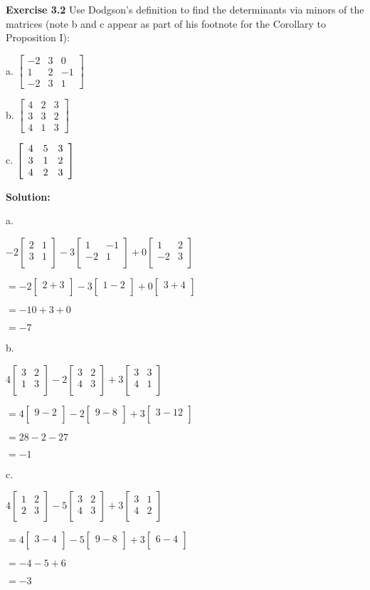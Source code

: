 \documentclass[12pt]{article}
\newcommand{\sol} {\textbf{Solution:}}
\newcommand{\matx}[1] {
\begin{bmatrix}
  #1 \\
\end{bmatrix}
}
\newcommand{\matxx}[2] {
\begin{bmatrix}
  #1 \\
  #2 \\
\end{bmatrix}
}
\begin{document}
\bigskip
\noindent\textbf{Exercise 3.2} Use Dodgson's definition to find the
determinants via minors of the matrices (note b and c appear as part of his
footnote for the Corollary to Proposition I):

a. $%
\begin{bmatrix}
-2 & 3 & 0\\
1 & 2 & -1\\
-2 & 3 & 1
\end{bmatrix}
$

b. $%
\begin{bmatrix}
4 & 2 & 3\\
3 & 3 & 2\\
4 & 1 & 3
\end{bmatrix}
$

c. $\left[
\begin{array}
[c]{ccc}%
4 & 5 & 3\\
3 & 1 & 2\\
4 & 2 & 3
\end{array}
\right]  $

\bigskip

\sol

a. 

\(-2 \matxx{2 & 1}{3 & 1} -3 \matxx{1 & -1}{-2 & 1} + 0 \matxx{1 &2}{-2 &3}\)

\(=-2 \matx{2 + 3} -3 \matx{1 - 2} + 0\matx{3 + 4}\)

\(= -10 + 3 + 0\)

\(= -7 \)

\bigskip
b.

\(4 \matxx{3 & 2}{1 & 3} -2 \matxx{3 & 2}{4 & 3} + 3 \matxx{3 &3}{4 &1}\)

\(=4 \matx{9 - 2} -2 \matx{9 - 8} + 3\matx{3 - 12}\)

\(= 28 - 2 - 27\)

\(= -1 \)

\bigskip
c.

\(4 \matxx{1 & 2}{2 & 3} -5 \matxx{3 & 2}{4 & 3} + 3 \matxx{3 &1}{4 &2}\)

\(=4 \matx{3 - 4} -5 \matx{9 - 8} + 3\matx{6 - 4}\)

\(= -4 - 5 + 6\)

\(= -3 \)
\end{document}
